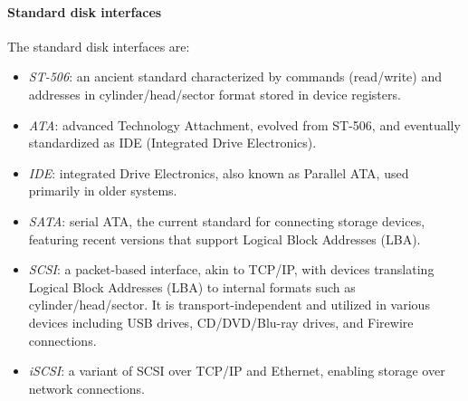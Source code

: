 \paragraph*{Standard disk interfaces}
The standard disk interfaces are: 
\begin{itemize}
    \item \textit{ST-506}: an ancient standard characterized by commands (read/write) and addresses in cylinder/head/sector format stored in device registers.
    \item \textit{ATA}: advanced Technology Attachment, evolved from ST-506, and eventually standardized as IDE (Integrated Drive Electronics).
    \item \textit{IDE}: integrated Drive Electronics, also known as Parallel ATA, used primarily in older systems.
    \item \textit{SATA}: serial ATA, the current standard for connecting storage devices, featuring recent versions that support Logical Block Addresses (LBA).
    \item \textit{SCSI}: a packet-based interface, akin to TCP/IP, with devices translating Logical Block Addresses (LBA) to internal formats such as cylinder/head/sector.
        It is transport-independent and utilized in various devices including USB drives, CD/DVD/Blu-ray drives, and Firewire connections.
    \item \textit{iSCSI}: a variant of SCSI over TCP/IP and Ethernet, enabling storage over network connections.
\end{itemize}


